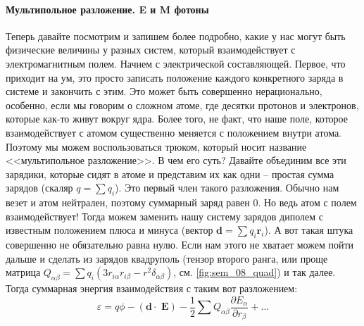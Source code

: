 \documentclass[12pt]{article}
\begin{document}
\paragraph{Мультипольное разложение. E и M фотоны}
Теперь давайте посмотрим и запишем более подробно, какие у нас могут быть физические величины у разных систем, который взаимодействует с электромагнитным полем. Начнем с электрической составляющей. Первое, что приходит на ум, это просто записать положение каждого конкретного заряда в системе и закончить с этим. Это может быть совершенно нерационально, особенно, если мы говорим о сложном атоме, где десятки протонов и электронов, которые как-то живут вокруг ядра. Более того, не факт, что наше поле, которое взаимодействует с атомом существенно меняется с положением внутри атома. Поэтому мы можем воспользоваться трюком, который носит название <<мультипольное разложение>>. В чем его суть? Давайте объединим все эти зарядики, которые сидят в атоме и представим их как одни -- простая сумма зарядов (скаляр $q = \sum q_i$). Это первый член такого разложения. Обычно нам везет и атом нейтрален, поэтому суммарный заряд равен 0. Но ведь атом с полем взаимодействует! Тогда можем заменить нашу систему зарядов диполем с известным положением плюса и минуса (вектор $\textbf{d} = \sum q_i \textbf{r}_i$). А вот такая штука совершенно не обязательно равна нулю. Если нам этого не хватает можем пойти дальше и сделать из зарядов квадруполь (тензор второго ранга, или проще матрица $Q_{\alpha\beta} = \sum q_i(3r_{i\alpha}r_{i\beta}-r^2\delta_{\alpha\beta}) $, см. \ref{fig:sem_08_quad}) и так далее. Тогда суммарная энергия взаимодействия с таким вот разложением:
\begin{equation*}
    \varepsilon = q\phi - (\textbf{d}\cdot\textbf{ E}) - \dfrac{1}{2}\sum Q_{\alpha\beta}\dfrac{\partial E_{\alpha}}{\partial r_{\beta}}+ \dots
\end{equation*}
\end{document}
